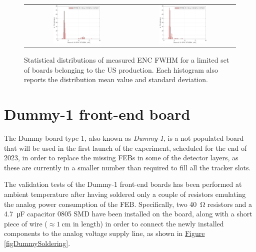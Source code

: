 \begin{figure}[h!]
\begin{tabular}{cc}
        \includegraphics[width=0.475\textwidth]{Images/chap2/results/ENC_23.pdf} & \includegraphics[width=0.475\textwidth]{Images/chap2/results/ENC_31.pdf}\\
    \end{tabular}
    \caption{Statistical distributions of measured ENC FWHM for a limited set of boards belonging to the US production. Each histogram also reports the distribution mean value and standard deviation.}
    \label{figFEBNoise}
\end{figure}



\section{Dummy-1 front-end board} \label{sec22}

The Dummy board type 1, also known as \textit{Dummy-1}, is a not populated board that will be used in the first launch of the experiment, scheduled for the end of 2023, in order to replace the missing FEBs in some of the detector layers, as these are currently in a smaller number than required to fill all the tracker slots.

The validation tests of the Dummy-1 front-end boards has been performed at ambient temperature after having soldered only a couple of resistors emulating the analog power consumption of the FEB. Specifically, two \SI{40}{\ohm} resistors and a \SI{4.7}{\micro\farad} capacitor 0805 SMD have been installed on the board, along with a short piece of wire ($\approx\SI{1}{\cm}$ in length) in order to connect the newly installed components to the analog voltage supply line, as shown in \hyperref[figDummySoldering]{Figure \ref{figDummySoldering}}. 


